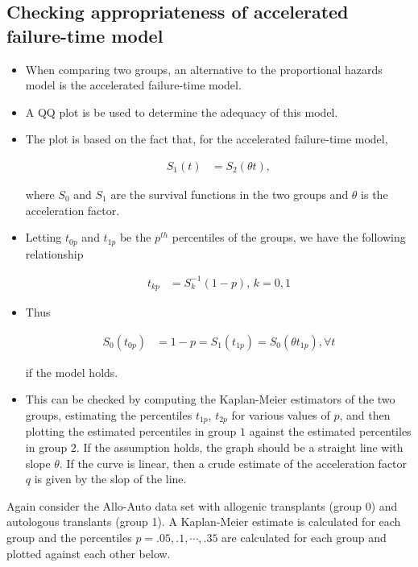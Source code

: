 \documentclass[10pt]{article}\usepackage[]{graphicx}\usepackage[]{xcolor}
\theoremstyle{definition}
\numberwithin{equation}{subsection}
\numberwithin{figure}{section}
\numberwithin{table}{subsection}
\numberwithin{Report}{section}
\numberwithin{Example}{subsection}
\begin{document}
\subsection{Checking appropriateness of accelerated failure-time model}
\begin{itemize}
\item When comparing two groups, an alternative to the proportional hazards model is the accelerated failure-time model.
\item A QQ plot is be used to determine the adequacy of this model.
\item The plot is based on the fact that, for the accelerated failure-time model,

\begin{align*}
S_{1}(t) & =S_{2}(\theta t),
\end{align*}

where $S_{0}$ and $S_{1}$ are the survival functions in the two
groups and $\theta$ is the acceleration factor.

\item Letting $t_{0p}$ and $t_{1p}$ be the $p^{th}$ percentiles
of the groups, we have the following relationship

\begin{align*}
t_{kp} & =S_{k}^{-1}(1-p), \, k = 0,1
\end{align*}

\item Thus 

\begin{align*}
S_{0}(t_{0p}) & =1-p=S_{1}(t_{1p})=S_{0}(\theta t_{1p}), \forall t
\end{align*}

if the model holds.

\item This can be checked by computing the Kaplan-Meier estimators of the
two groups, estimating the percentiles $t_{1p}$, $t_{2p}$ for various
values of $p$, and then plotting the estimated percentiles in group
$1$ against the estimated percentiles in group $2$. If the assumption
holds, the graph should be a straight line with slope $\theta$. If the curve is linear, then a crude estimate of the acceleration factor $q$ is given by the slop of the line. \end{itemize}


\noindent Again consider the Allo-Auto data set with allogenic transplants (group 0) and autologous translants (group 1). A Kaplan-Meier estimate is calculated for each group and the percentiles $p=.05,.1,\cdots,.35$ are calculated for each group and plotted against each other below.
\end{document}
